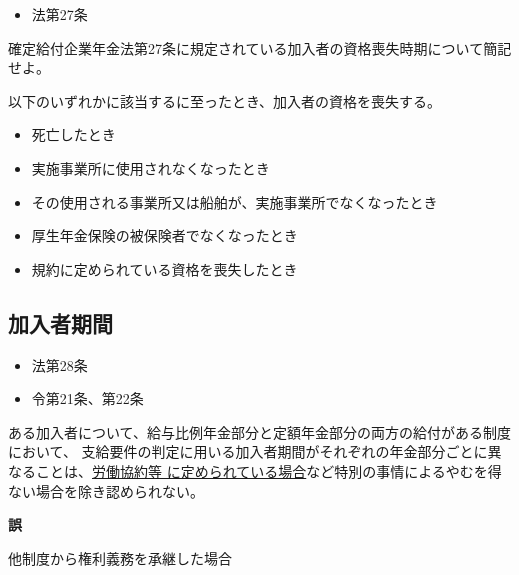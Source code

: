 \begin{InyouJobunbox}
  \begin{itemize}
    \item 法第27条
  \end{itemize}
\end{InyouJobunbox}

\begin{shortanswer}[自作 2026/10/11]
  確定給付企業年金法第27条に規定されている加入者の資格喪失時期について簡記せよ。
\end{shortanswer}

\begin{answerbox}
  以下のいずれかに該当するに至ったとき、加入者の資格を喪失する。
  \begin{itemize}
    \item 死亡したとき
    \item 実施事業所に使用されなくなったとき
    \item その使用される事業所又は船舶が、実施事業所でなくなったとき
    \item 厚生年金保険の被保険者でなくなったとき
    \item 規約に定められている資格を喪失したとき
  \end{itemize}  
\end{answerbox}

\newpage

\subsection{加入者期間}

\begin{InyouJobunbox}
  \begin{itemize}
    \item 法第28条
    \item 令第21条、第22条
  \end{itemize}
\end{InyouJobunbox}

\begin{truefalse}[年金1 2022 問題1(3)イ]
ある加入者について、給与比例年金部分と定額年金部分の両方の給付がある制度において、
支給要件の判定に用いる加入者期間がそれぞれの年金部分ごとに異なることは、\underline{労働協約等
に定められている場合}など特別の事情によるやむを得ない場合を除き認められない。
\end{truefalse}

\begin{answerbox}
  \textbf{誤}

  他制度から権利義務を承継した場合
\end{answerbox}


